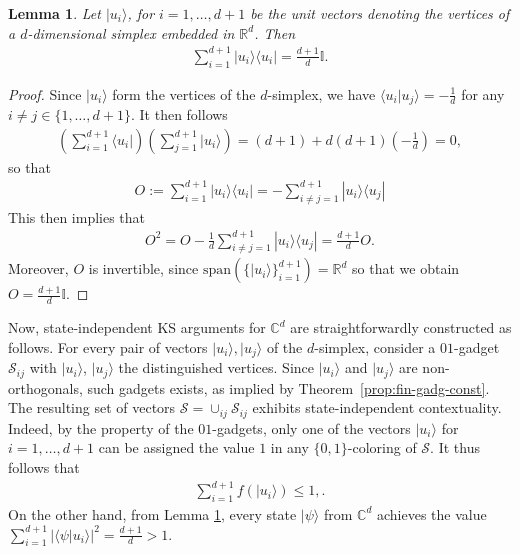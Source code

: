 \documentclass[twocolumn, a4paper, superscriptaddress,nofootinbib, accepted=2020-08-07, hyperref]{quantumarticle}
\newtheorem{lemma}{Lemma}
\begin{document}
\begin{lemma}
	\label{lem:d-simplex}
	Let $|u_i \rangle$, for $i =1, \dots, d+1$ be the unit vectors denoting the vertices of a $d$-dimensional simplex embedded in $\mathbb{R}^d$. Then 
	\begin{eqnarray}
	\sum_{i=1}^{d+1} |u_i \rangle \langle u_i | = \frac{d+1}{d} \mathbb{I}.
	\end{eqnarray}
\end{lemma}
\begin{proof}
Since $|u_i \rangle$ form the vertices of the $d$-simplex, we have $ \langle u_i | u_j \rangle = -\frac{1}{d}$ for any $i \neq j \in \{1, \dots, d+1\}$. It then follows 
	\begin{eqnarray}
	\left(\sum_{i=1}^{d+1} \langle u_i | \right) \left(\sum_{j=1}^{d+1} | u_i \rangle \right) = (d+1) + d(d+1)\left(-\frac{1}{d} \right) = 0, \nonumber
	\end{eqnarray}
	so that 
	\begin{eqnarray}
	O := \sum_{i=1}^{d+1} |u_i \rangle \langle u_i| = -\sum_{i \neq j = 1}^{d+1} | u_i \rangle \langle u_j|
	\end{eqnarray}
	This then implies that
	\begin{eqnarray}
	O^{2} = O - \frac{1}{d} \sum_{i \neq j =1}^{d+1} |u_i \rangle \langle u_j| = \frac{d+1}{d} O.
	\end{eqnarray}
    Moreover, $O$ is invertible, since $\text{span}(\{|u_i \rangle\}_{i=1}^{d+1}) = \mathbb{R}^d$ so that we obtain $O = \frac{d+1}{d} \mathbb{I}$.
\end{proof}
Now, state-independent KS arguments for $\mathbb{C}^d$ are straightforwardly constructed as follows. For every pair of vectors $|u_i \rangle, |u_j \rangle$ of the $d$-simplex, consider a $01$-gadget $\mathcal{S}_{ij}$ with $|u_i\rangle$, $|u_j\rangle$ the distinguished vertices. Since $|u_i\rangle$ and $|u_j\rangle$ are non-orthogonals, such gadgets exists, as implied by Theorem~\ref{prop:fin-gadg-const}. The resulting set of vectors $\mathcal{S}=\cup_{ij} \mathcal{S}_{ij}$ exhibits state-independent contextuality. Indeed, by the property of the $01$-gadgets, only one of the vectors $|u_i \rangle$ for $i =1, \dots, d+1$ can be assigned the value $1$ in any $\{0,1\}$-coloring of $\mathcal{S}$. It thus follows that
\begin{eqnarray}
\sum_{i=1}^{d+1} f(|u_i \rangle) \leq 1,.
\end{eqnarray}
On the other hand, from Lemma \ref{lem:d-simplex}, every state $|\psi\rangle$ from $\mathbb{C}^d$ achieves the value $\sum_{i=1}^{d+1} |\langle\psi|u_i\rangle|^2=\frac{d+1}{d}>1$.
\end{document}
